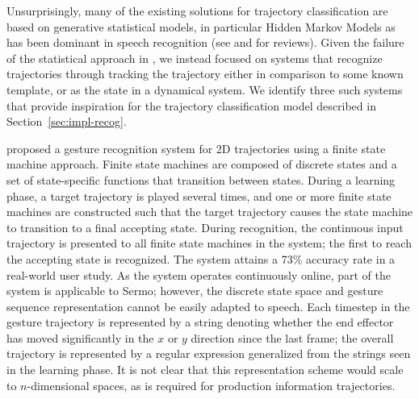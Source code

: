 
Unsurprisingly, many of the existing
solutions for trajectory classification
are based on generative statistical models,
in particular Hidden Markov Models
as has been dominant in speech recognition
(see \cite{mlich2008,nascimento2010}
and \cite{mitra2007,weinland2011,rautaray2015}
for reviews).
Given the failure of the statistical approach
in \cite{mitra2014},
we instead focused on systems
that recognize trajectories
through tracking the trajectory
either in comparison to some known template,
or as the state in a dynamical system.
We identify three such systems
that provide inspiration
for the trajectory classification model
described in Section~\ref{sec:impl-recog}.

\cite{kiliboz2015} proposed
a gesture recognition system
for 2D trajectories
using a finite state machine approach.
Finite state machines are composed of
discrete states and a set of state-specific
functions that transition between states.
During a learning phase,
a target trajectory is played
several times,
and one or more finite state machines
are constructed such that
the target trajectory
causes the state machine
to transition to a final accepting state.
During recognition,
the continuous input trajectory
is presented to all finite state machines
in the system;
the first to reach the accepting state is recognized.
The system attains a 73\% accuracy rate
in a real-world user study.
As the system operates continuously online,
part of the system is applicable to Sermo;
however, the discrete state space and
gesture sequence representation
cannot be easily adapted to speech.
Each timestep in the gesture trajectory
is represented by a string denoting whether the
end effector has moved significantly
in the $x$ or $y$ direction since the last frame;
the overall trajectory is represented
by a regular expression generalized from
the strings seen in the learning phase.
It is not clear that this representation scheme
would scale to $n$-dimensional spaces,
as is required for production information trajectories.

